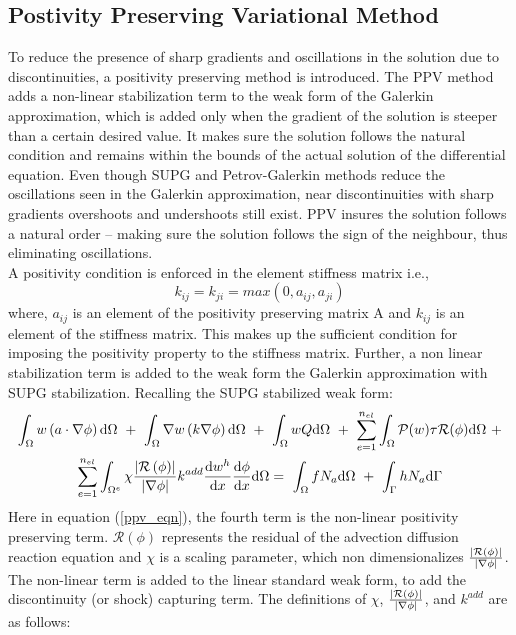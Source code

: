 \documentclass[12pt, oneside]{article}
\begin{document}
\subsection{Postivity Preserving Variational Method}
To reduce the presence of sharp gradients and oscillations in the solution due to discontinuities, a positivity preserving method is introduced. The PPV method adds a non-linear stabilization term to the weak form of the Galerkin approximation, which is added only when the gradient of the solution is steeper than a certain desired value. It makes sure the solution follows the natural condition and remains within the bounds of the actual solution of the differential equation. Even though SUPG and Petrov-Galerkin methods reduce the oscillations seen in the Galerkin approximation, near discontinuities with sharp gradients overshoots and undershoots still exist. PPV insures the solution follows a natural order -- making sure the solution follows the sign of the neighbour, thus eliminating oscillations.\\
A positivity condition is enforced in the element stiffness matrix i.e.,
   \begin{equation}
       k_{ij} = k_{ji} = max(0, a_{ij}, a_{ji})
 \end{equation}
 where, $a_{ij}$ is an element of the positivity preserving matrix A and $k_{ij}$ is an element of the stiffness matrix. This makes up the sufficient condition for imposing the positivity property to the stiffness matrix. Further, a non linear stabilization term is added to the weak form the Galerkin approximation with SUPG stabilization. Recalling the SUPG stabilized weak form:
 \begin{equation}
    \begin{gathered}
	\int_\Omega w \left( a \cdot \nabla \phi \right) \dd \Omega\ +\ \int_\Omega \nabla w \left( k \nabla \phi \right) \dd \Omega\ +\ \int_\Omega wQ \dd \Omega\ +\ \sum_{e=1}^{n_{el}} \int_\Omega \mathcal{P}(w) \tau \mathcal{R}(\phi) \dd \Omega\ +\\
	\sum_{e=1}^{n_{el}} \int_{\Omega^e} \chi \frac{\abs{\mathcal{R}\left(\phi\right)}}{\abs{\nabla \phi}} k^{add} \frac{\dd w^h}{\dd x} \frac{\dd \phi}{\dd x} \dd \Omega =\ \int_\Omega f N_a \dd \Omega\ +\ \int_\Gamma h N_a \dd \Gamma 
    \label{ppv_eqn}
    \end{gathered}
 \end{equation}
 Here in equation (\ref{ppv_eqn}), the fourth term is the non-linear positivity preserving term. $\mathcal{R(\phi)}$ represents the residual of the advection diffusion reaction equation and $\chi$ is a scaling parameter, which non dimensionalizes $\frac{\abs{\mathcal{R}(\phi)}}{\abs{\nabla \phi}}$. The non-linear term is added to the linear standard weak form, to add the discontinuity (or shock) capturing term. The definitions of $\chi$, $\frac{\abs{\mathcal{R}(\phi)}}{\abs{\nabla \phi}}$, and $k^{add}$ are as follows:
\end{document}
